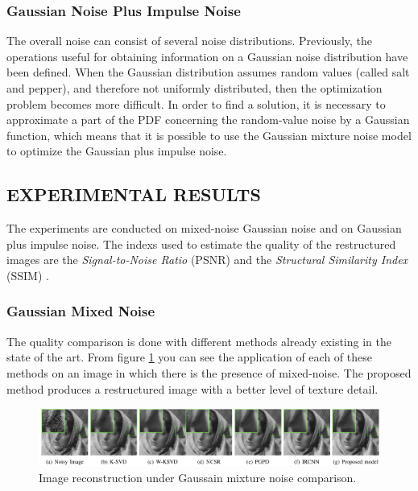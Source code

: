 \subsubsection{Gaussian Noise Plus Impulse Noise}
The overall noise can consist of several noise distributions. Previously, the 
operations useful for obtaining information on a Gaussian noise distribution 
have been defined. When the Gaussian distribution assumes random values 
(called salt and pepper), and therefore not uniformly distributed, then the 
optimization problem becomes more difficult. In order to find a solution, it 
is necessary to approximate a part of the PDF concerning the random-value 
noise by a Gaussian function, which means that it is possible to use the 
Gaussian mixture noise model to optimize the Gaussian plus impulse noise.

\subsection{EXPERIMENTAL RESULTS}
The experiments are conducted on mixed-noise Gaussian noise and on Gaussian 
plus impulse noise. The indexs used to estimate the quality of the restructured
images are the \emph{Signal-to-Noise Ratio} (PSNR) and the \emph{Structural 
Similarity Index} (SSIM) \cite{0884882841}.

\subsubsection{Gaussian Mixed Noise}
The quality comparison is done with different methods already existing in 
the state of the art. From figure \ref{fig:GMNComp} you can see the application of 
each of these methods on an image in which there is the presence of mixed-noise. 
The proposed method produces a restructured image with a better level of 
texture detail.
\begin{figure}[h!]
    \centering
    \includegraphics[width = \linewidth]{images/paper7/GMN comparison.png}
    \centering
    \caption{Image reconstruction under Gaussain mixture noise comparison.}
    \label{fig:GMNComp}
\end{figure}

